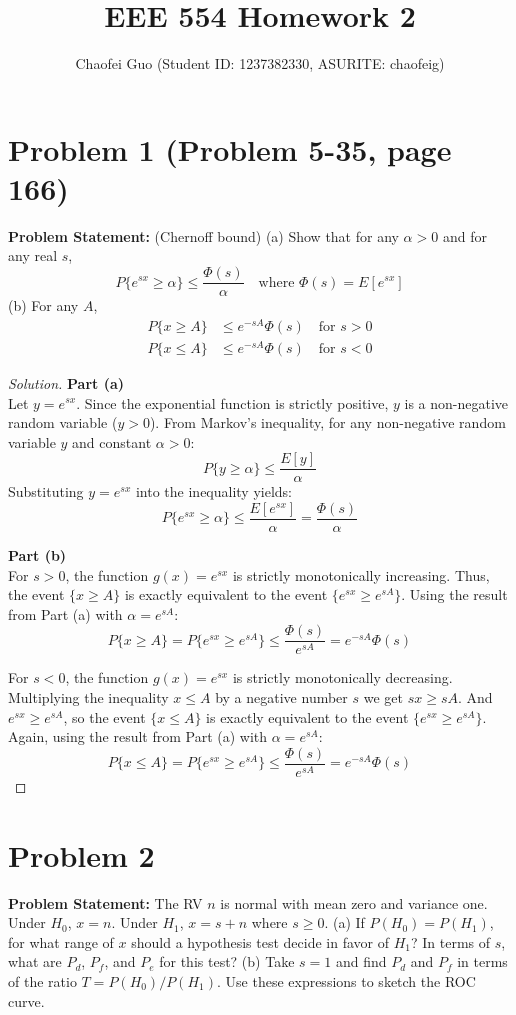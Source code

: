 \documentclass{article}
\title{EEE 554 Homework 2}
\author{Chaofei Guo (Student ID: 1237382330, ASURITE: chaofeig)}
\date{}
\begin{document}
\maketitle

\section*{Problem 1 (Problem 5-35, page 166)}
\textbf{Problem Statement:}
(Chernoff bound)
(a) Show that for any $\alpha > 0$ and for any real $s$,
\[ P\{e^{sx} \ge \alpha\} \le \frac{\Phi(s)}{\alpha} \quad \text{where } \Phi(s) = E[e^{sx}] \]
(b) For any $A$,
\begin{align*}
P\{x \ge A\} &\le e^{-sA}\Phi(s) \quad \text{for } s > 0 \\
P\{x \le A\} &\le e^{-sA}\Phi(s) \quad \text{for } s < 0
\end{align*}

\begin{proof}[Solution]
	\textbf{Part (a)}\\
	Let $y = e^{sx}$. Since the exponential function is strictly positive, $y$ is a non-negative random variable ($y > 0$).
	From Markov's inequality, for any non-negative random variable $y$ and constant $\alpha > 0$:
	\[ P\{y \ge \alpha\} \le \frac{E[y]}{\alpha} \]
	Substituting $y = e^{sx}$ into the inequality yields:
	\[ P\{e^{sx} \ge \alpha\} \le \frac{E[e^{sx}]}{\alpha} = \frac{\Phi(s)}{\alpha} \]
	
	\textbf{Part (b)}\\
	For $s > 0$, the function $g(x) = e^{sx}$ is strictly monotonically increasing. Thus, the event $\{x \ge A\}$ is exactly equivalent to the event $\{e^{sx} \ge e^{sA}\}$.
	Using the result from Part (a) with $\alpha = e^{sA}$:
	\[ P\{x \ge A\} = P\{e^{sx} \ge e^{sA}\} \le \frac{\Phi(s)}{e^{sA}} = e^{-sA}\Phi(s) \]
	
	For $s < 0$, the function $g(x) = e^{sx}$ is strictly monotonically decreasing. Multiplying the inequality $x \le A$ by a negative number $s$ we get $sx \ge sA$. And $e^{sx} \ge e^{sA}$, so the event $\{x \le A\}$ is exactly equivalent to the event $\{e^{sx} \ge e^{sA}\}$.
	Again, using the result from Part (a) with $\alpha = e^{sA}$:
	\[ P\{x \le A\} = P\{e^{sx} \ge e^{sA}\} \le \frac{\Phi(s)}{e^{sA}} = e^{-sA}\Phi(s) \]
\end{proof}

\vspace{1cm}

\section*{Problem 2}
\textbf{Problem Statement:}
The RV $n$ is normal with mean zero and variance one. Under $H_0$, $x=n$. Under $H_1$, $x=s+n$ where $s \ge 0$.
(a) If $P(H_0)=P(H_1)$, for what range of $x$ should a hypothesis test decide in favor of $H_1$? In terms of $s$, what are $P_d$, $P_f$, and $P_e$ for this test?
(b) Take $s=1$ and find $P_d$ and $P_f$ in terms of the ratio $T=P(H_0)/P(H_1)$. Use these expressions to sketch the ROC curve.
\end{document}
